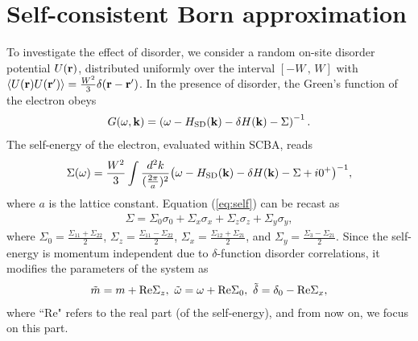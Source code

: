 \documentclass[aps,prb,showpacs,twocolumn,floats]{revtex4-1}
\begin{document}
\section{Self-consistent Born approximation}
To investigate the effect of disorder, we consider a random on-site disorder potential $U({\bf r})$, 
distributed uniformly over the interval $[-W\,,\,W]$ with  $\langle U({\bf r})U({\bf r'})\rangle=\frac{W^2}{3} \delta({\bf r-r'} )$. 
In the presence of disorder, the Green's function of the electron obeys \cite{adrouger} 
\begin{align}
G(\omega, {\bf k})=\left(\omega-H_{\rm SD}({\bf k}) - \delta H({\bf k}) -\Sigma\right)^{-1}.
\end{align}
The self-energy of the electron, evaluated within SCBA, reads 
\begin{align}
\Sigma(\omega)=\frac{W^2}{3}\int \frac{d^2k}{(\frac{2\pi}{a})^2} {\left(\omega-H_{\rm SD}({\bf k}) - \delta H({\bf k}) - \Sigma+i0^{+}\right)^{-1}},
\label{eq:self}
\end{align}
where $a$ is the lattice constant. Equation (\ref{eq:self}) can be recast as  
\begin{align}
\Sigma=\Sigma_0\sigma_0+\Sigma_x\sigma_x+\Sigma_z\sigma_z+\Sigma_y\sigma_y, \label{eq:self_energy}
\end{align}
where $\Sigma_0=\frac{\Sigma_{11}+\Sigma_{22}}{2}$, $\Sigma_z=\frac{\Sigma_{11}-\Sigma_{22}}{2}$, $\Sigma_x=\frac{\Sigma_{12}+\Sigma_{21}}{2}$,
and $\Sigma_y=\frac{\Sigma_{3}-\Sigma_{21}}{2}$. 
Since the self-energy is momentum independent due to $\delta$-function disorder correlations, it modifies the parameters of the system as \cite{benakker}
\begin{align}
{\tilde m}=m+{\rm Re}\Sigma_z,~ {\tilde \omega}=\omega+{\rm Re}\Sigma_0, ~{\tilde \delta}=\delta_0-{\rm Re}\Sigma_x ,
\end{align}   
where  ``Re" refers to the real part (of the self-energy), and from now on, we focus on this part.
\end{document}
